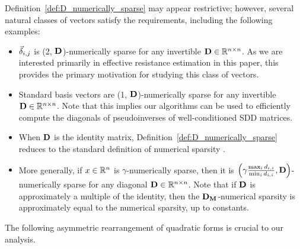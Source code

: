 Definition~\ref{def:D_numerically_sparse} may appear restrictive; however, several natural classes of vectors satisfy the requirements, including the following examples: 
\begin{itemize}[leftmargin=*]
    \item $\vec{\delta}_{i,j}$ is (2, $\mathbf{D}$)-numerically sparse for any invertible $\mathbf{D} \in \mathbb{R}^{n \times n}$. As we are interested primarily in effective resistance estimation in this paper, this provides the primary motivation for studying this class of vectors. 
    \item Standard basis vectors are (1, $\mathbf{D}$)-numerically sparse for any invertible $\mathbf{D} \in \mathbb{R}^{n \times n}$. Note that this implies our algorithms can be used to efficiently compute the diagonals of pseudoinverses of well-conditioned SDD matrices. 
    \item When $\mathbf{D}$ is the identity matrix, Definition~\ref{def:D_numerically_sparse} reduces to the standard definition of numerical sparsity \cite{GS2018}. 
    \item More generally, if $x \in \mathbb{R}^n$ is $\gamma$-numerically sparse, then it is $\left(\gamma {\frac{\max_{i} d_{i,i}}{\min_{i} d_{i,i}}}, \mathbf{D}\right)$-numerically sparse for any diagonal $\mathbf{D} \in \mathbb{R}^{n \times n}$. Note that if $\mathbf{D}$ is approximately a multiple of the identity, then the ${\mathbf{D}}_{\mathbf{M}}$-numerical sparsity is approximately equal to the numerical sparsity, up to constants. 
\end{itemize}

The following asymmetric rearrangement of quadratic forms is crucial to our analysis. 

